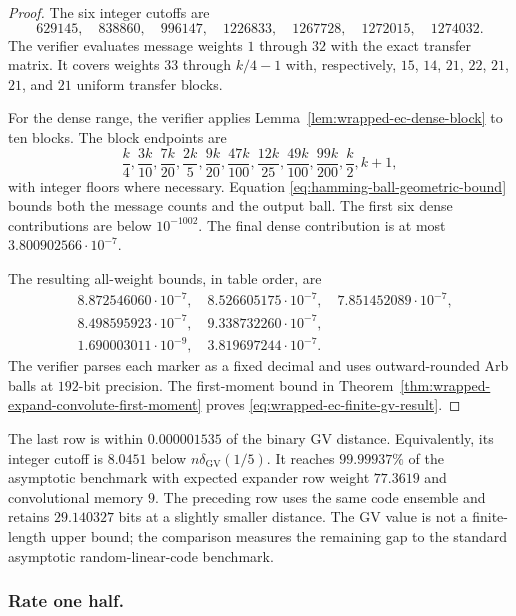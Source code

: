 \begin{proof}
The six integer cutoffs are
\[
 629145,\quad 838860,\quad 996147,\quad
 1226833,\quad 1267728,\quad 1272015,\quad 1274032.
\]
The verifier evaluates message weights $1$ through $32$ with the exact
transfer matrix.  It covers weights $33$ through $k/4-1$ with, respectively,
$15$, $14$, $21$, $22$, $21$, $21$, and $21$ uniform transfer blocks.

For the dense range, the verifier applies
Lemma~\ref{lem:wrapped-ec-dense-block} to ten blocks.  The block endpoints are
\[
 \frac{k}{4},\frac{3k}{10},\frac{7k}{20},\frac{2k}{5},
 \frac{9k}{20},\frac{47k}{100},\frac{12k}{25},
 \frac{49k}{100},\frac{99k}{200},\frac{k}{2},k+1,
\]
with integer floors where necessary.  Equation
\eqref{eq:hamming-ball-geometric-bound} bounds both the message counts and the
output ball.  The first six dense contributions are below $10^{-1002}$.
The final dense contribution is at most
$3.800902566\mathbin{\cdot}10^{-7}$.

The resulting all-weight bounds, in table order, are
\[
\begin{split}
 &8.872546060\mathbin{\cdot}10^{-7},\quad
  8.526605175\mathbin{\cdot}10^{-7},\quad
  7.851452089\mathbin{\cdot}10^{-7},\\
 &8.498595923\mathbin{\cdot}10^{-7},\quad
  9.338732260\mathbin{\cdot}10^{-7},\\
 &1.690003011\mathbin{\cdot}10^{-9},\quad
  3.819697244\mathbin{\cdot}10^{-7}.
\end{split}
\]
The verifier parses each marker as a fixed decimal and uses outward-rounded
Arb balls at $192$-bit precision.  The first-moment bound in
Theorem~\ref{thm:wrapped-expand-convolute-first-moment} proves
\eqref{eq:wrapped-ec-finite-gv-result}.
\end{proof}

The last row is within $0.000001535$ of the binary GV distance.  Equivalently,
its integer cutoff is $8.0451$ below $n\delta_{\mathrm{GV}}(1/5)$.  It reaches
$99.99937\%$ of the asymptotic benchmark with expected expander row weight
$77.3619$ and convolutional memory $9$.  The preceding row uses the same code
ensemble and retains $29.140327$ bits at a slightly smaller distance.  The GV
value is not a finite-length upper bound; the comparison measures the
remaining gap to the standard asymptotic random-linear-code benchmark.

\subsubsection{Rate one half.}


